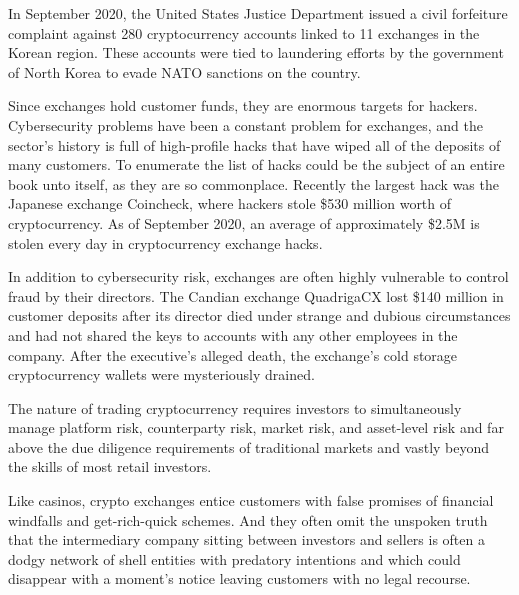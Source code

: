 
In September 2020, the United States Justice Department issued a civil
forfeiture complaint against 280 cryptocurrency accounts linked to 11 exchanges
in the Korean region. These accounts were tied to laundering efforts by the
government of North Korea to evade NATO sanctions on the country.


Since exchanges hold customer funds, they are enormous targets for hackers.
Cybersecurity problems have been a constant problem for exchanges, and the
sector's history is full of high-profile hacks that have wiped all of the
deposits of many customers. To enumerate the list of hacks could be the subject
of an entire book unto itself, as they are so commonplace. Recently the largest
hack was the Japanese exchange Coincheck, where hackers stole \$530 million worth
of cryptocurrency. As of September 2020, an average of approximately \$2.5M is
stolen every day in cryptocurrency exchange hacks.

In addition to cybersecurity risk, exchanges are often highly vulnerable to
control fraud by their directors. The Candian exchange QuadrigaCX lost \$140
million in customer deposits after its director died under strange and dubious
circumstances and had not shared the keys to accounts with any other employees
in the company. After the executive's alleged death, the exchange's cold storage
cryptocurrency wallets were mysteriously drained.


The nature of trading cryptocurrency requires investors to simultaneously manage
platform risk, counterparty risk, market risk, and asset-level risk and far
above the due diligence requirements of traditional markets and vastly beyond
the skills of most retail investors. \cite{roubini_great_2019}

Like casinos, crypto exchanges entice customers with false promises of financial
windfalls and get-rich-quick schemes. And they often omit the unspoken truth
that the intermediary company sitting between investors and sellers is often a
dodgy network of shell entities with predatory intentions and which could
disappear with a moment's notice leaving customers with no legal recourse.
